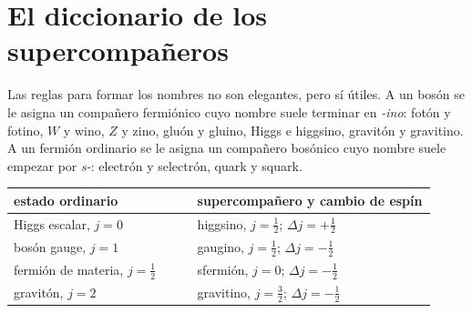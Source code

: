 \begin{classroomqa}\end{classroomqa}

\begin{classroomqa}\end{classroomqa}

\section{El diccionario de los supercompañeros}

Las reglas para formar los nombres no son elegantes, pero sí útiles. A un bosón se le asigna un compañero fermiónico cuyo nombre suele terminar en \emph{-ino}: fotón y fotino, \(W\) y wino, \(Z\) y zino, gluón y gluino, Higgs e higgsino, gravitón y gravitino. A un fermión ordinario se le asigna un compañero bosónico cuyo nombre suele empezar por \emph{s-}: electrón y selectrón, quark y squark.

\begin{center}
\begin{tabular}{@{}>{\raggedright\arraybackslash}p{0.40\linewidth}>{\raggedright\arraybackslash}p{0.52\linewidth}@{}}
\toprule
estado ordinario & supercompañero y cambio de espín\\
\midrule
Higgs escalar, \(j=0\) & higgsino, \(j=\tfrac12\); \(\Delta j=+\tfrac12\)\\
bosón gauge, \(j=1\) & gaugino, \(j=\tfrac12\); \(\Delta j=-\tfrac12\)\\
fermión de materia, \(j=\tfrac12\) & sfermión, \(j=0\); \(\Delta j=-\tfrac12\)\\
gravitón, \(j=2\) & gravitino, \(j=\tfrac32\); \(\Delta j=-\tfrac12\)\\
\bottomrule
\end{tabular}
\end{center}

